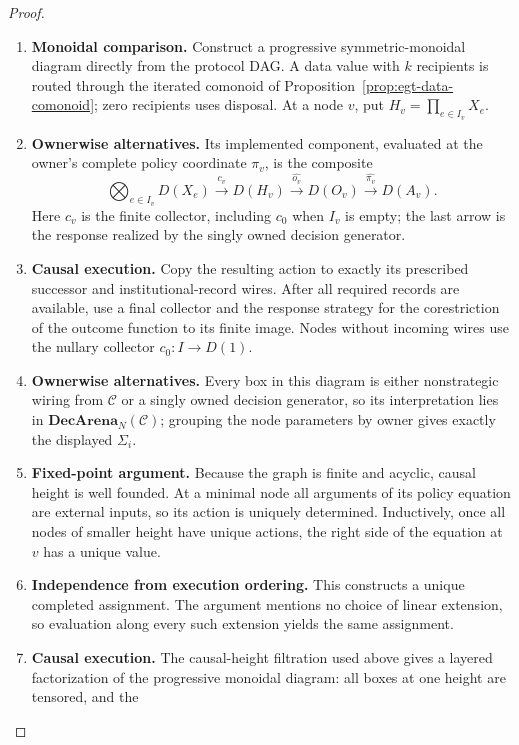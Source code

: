 \documentclass[11pt,a4paper]{article}
\numberwithin{equation}{section}
\theoremstyle{definition}
\theoremstyle{remark}
\theoremstyle{plain}
\begin{document}
\begin{proof}
\leavevmode
\begin{enumerate}[label=\textup{(\arabic*)},leftmargin=*,itemsep=4pt,topsep=3pt]
  \item \textbf{Monoidal comparison.} Construct a progressive symmetric-monoidal diagram directly from the protocol
DAG. A data value with $k$ recipients is routed through the iterated comonoid
of Proposition~\ref{prop:egt-data-comonoid}; zero recipients uses disposal. At a node $v$, put $H_v=\prod_{e\in I_v}X_e$.
  \item \textbf{Ownerwise alternatives.} Its implemented
component, evaluated at the owner's complete policy coordinate $\pi_v$,
is the composite
\[
 \bigotimes_{e\in I_v}D(X_e)
 \xrightarrow{c_v}D(H_v)
 \xrightarrow{\widehat{o_v}}D(O_v)
 \xrightarrow{\widehat{\pi_v}}D(A_v).
\]
Here $c_v$ is the finite collector, including $c_0$ when $I_v$ is
empty; the last arrow is the response realized by the singly owned
decision generator.
  \item \textbf{Causal execution.} Copy the
resulting action to exactly its prescribed successor and institutional-record
wires. After all required records are available, use a final collector and
the response strategy for the corestriction of the outcome function to its
finite image. Nodes without incoming wires
use the nullary collector $c_0:I\to D(1)$.
  \item \textbf{Ownerwise alternatives.} Every box in this diagram is either
nonstrategic wiring from $\mathcal C$ or a singly owned decision generator, so
its interpretation lies in $\mathbf{DecArena}_N(\mathcal C)$; grouping the node
parameters by owner gives exactly the displayed $\Sigma_i$.
  \item \textbf{Fixed-point argument.} Because the graph is finite and acyclic, causal height is well founded. At a
minimal node all arguments of its policy equation are external inputs, so its
action is uniquely determined. Inductively, once all nodes of smaller height
have unique actions, the right side of the equation at $v$ has a unique value.
  \item \textbf{Independence from execution ordering.} This constructs a unique completed assignment. The argument mentions no
choice of linear extension, so evaluation along every such extension yields
the same assignment.
  \item \textbf{Causal execution.} The causal-height filtration used above gives a layered factorization of the
progressive monoidal diagram: all boxes at one height are tensored, and the

\end{enumerate}
\end{proof}
\end{document}
